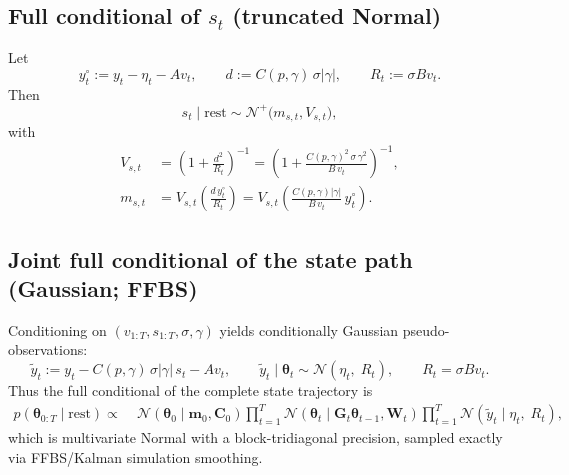 \documentclass[11pt]{article}
\newcommand{\1}{\mathbb{I}}
\newcommand{\N}{\mathcal{N}}
\begin{document}
\subsection{Full conditional of \texorpdfstring{$s_t$}{st} (truncated Normal)}

Let
\[
y_t^\circ := y_t - \eta_t - A v_t,\qquad d:=C(p,\gamma)\,\sigma|\gamma|,\qquad R_t:=\sigma B v_t.
\]
Then
\[
s_t\mid \text{rest}\sim \N^+\!\big(m_{s,t},V_{s,t}\big),
\]
with
\begin{align}
V_{s,t} &= \left(1+\frac{d^2}{R_t}\right)^{-1}
=\left(1+\frac{C(p,\gamma)^2\,\sigma\,\gamma^2}{B\,v_t}\right)^{-1},\label{eq:cond_s_V}\\
m_{s,t} &= V_{s,t}\left(\frac{d\,y_t^\circ}{R_t}\right)
=V_{s,t}\left(\frac{C(p,\gamma)|\gamma|}{B\,v_t}\,y_t^\circ\right).\label{eq:cond_s_m}
\end{align}

\subsection{Joint full conditional of the state path (Gaussian; FFBS)}

Conditioning on $(v_{1:T},s_{1:T},\sigma,\gamma)$ yields conditionally Gaussian pseudo-observations:
\[
\tilde y_t := y_t - C(p,\gamma)\,\sigma|\gamma|\,s_t - A v_t,
\qquad
\tilde y_t\mid \bm\theta_t \sim \N(\eta_t,\;R_t),
\qquad
R_t=\sigma B v_t.
\]
Thus the full conditional of the complete state trajectory is
\begin{align}
p(\bm\theta_{0:T}\mid \text{rest})
\propto\;&
\N(\bm\theta_0\mid \bm m_0,\bm C_0)
\prod_{t=1}^T \N(\bm\theta_t\mid \bm G_t\bm\theta_{t-1},\bm W_t)
\prod_{t=1}^T \N(\tilde y_t\mid \eta_t,\;R_t),\label{eq:cond_state_path}
\end{align}
which is multivariate Normal with a block-tridiagonal precision, sampled exactly via FFBS/Kalman simulation smoothing.
\end{document}
